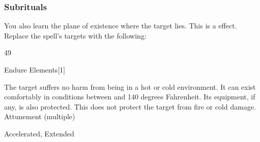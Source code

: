 \subsubsection{Subrituals}
You also learn the plane of existence where the target lies.
This is a  effect.
Replace the spell's targets with the following:
\begin{spellcontent}
\begin{augmenttargetinginfo}
 49
\end{augmenttargetinginfo}
\end{spellcontent}
\begin{spellsection}{Endure Elements}[1]
\begin{spellcontent}
\begin{spelltargetinginfo}
\end{spelltargetinginfo}
\begin{spelleffects}
\spelleffect
The target suffers no harm from being in a hot or cold environment.
It can exist comfortably in conditions between  and 140 degrees Fahrenheit.
Its equipment, if any, is also protected.
This does not protect the target from fire or cold damage.
\spelldur Attunement (multiple)
\end{spelleffects}
\end{spellcontent}
\begin{spellfooter}
 Accelerated, Extended
\end{spellfooter}
\begin{spellsubcontent}
\end{spellsubcontent}
\end{spellsection}
